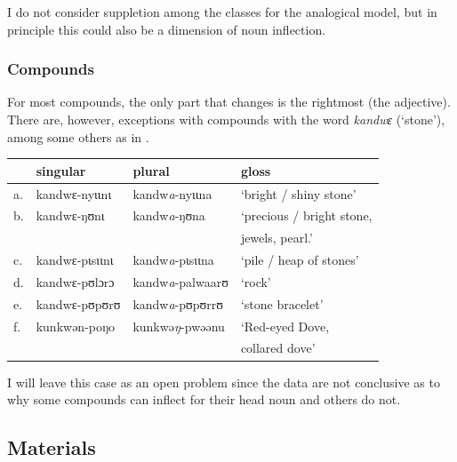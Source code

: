 I do not consider suppletion among the classes for the analogical model, but in principle this could also be a dimension of noun inflection.

\subsubsection{Compounds}

For most compounds, the only part that changes is the rightmost (the adjective). There are, however, exceptions with compounds with the word \textit{kandwɛ} (`stone'), among some others as in .

\begin{exe}
    \ex \label{except-stone}
    \begin{tabular}[t]{llll}
         & singular       & plural                   & gloss                          \\
      \midrule
      a. & kandwɛ-nyɩɩnɩ  & kandw\textit{a}-nyɩɩna   & `bright / shiny stone'         \\
      b. & kandwɛ-ŋʊnɩ    & kandw\textit{a}-ŋʊna     & `precious / bright stone,       \\
         &                &                          & jewels, pearl.'              \\
      c. & kandwɛ-pɩsɩɩnɩ & kandw\textit{a}-pɩsɩɩna  & `pile / heap of stones'        \\
      d. & kandwɛ-pʊlɔrɔ  & kandw\textit{a}-palwaarʊ & `rock'                         \\
      e. & kandwɛ-pʊpʊrʊ  & kandw\textit{a}-pʊpʊrrʊ  & `stone bracelet'               \\
      f. & kunkwən-poŋo   & kunkwə\textit{ŋ}-pwəənu  & `Red-eyed Dove,\\
      &&&  collared dove' \\
    \end{tabular}
\end{exe}

I will leave this case as an open problem since the data are not conclusive as to why some compounds can inflect for their head noun and others do not.

\subsection{Materials}

